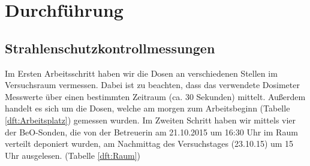 \section{Durchführung}

\subsection{Strahlenschutzkontrollmessungen}
Im Ersten Arbeitsschritt haben wir die Dosen an verschiedenen Stellen im Versuchsraum vermessen. Dabei ist zu beachten, dass das verwendete Dosimeter Messwerte über einen bestimmten Zeitraum (ca. 30 Sekunden) mittelt. Außerdem handelt es sich um die Dosen, welche am morgen zum Arbeitsbeginn (Tabelle \ref{dft:Arbeitsplatz}) gemessen wurden. 
Im Zweiten Schritt haben wir mittels vier der BeO-Sonden, die von der Betreuerin am 21.10.2015 um 16:30 Uhr im Raum verteilt deponiert wurden, am Nachmittag des Versuchstages (23.10.15) um 15 Uhr ausgelesen. (Tabelle \ref{dft:Raum}) \\
	
